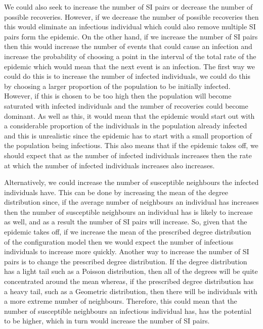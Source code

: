 \documentclass{uonmathsreport}
\begin{document}
We could also seek to increase the number of SI pairs or decrease the number of possible recoveries. However, if we decrease the number of possible recoveries then this would eliminate an infectious individual which could also remove multiple SI pairs form the epidemic. On the other hand, if we increase the number of SI pairs then this would increase the number of events that could cause an infection and increase the probability of choosing a point in the interval of the total rate of the epidemic which would mean that the next event is an infection. The first way we could do this is to increase the number of infected individuals, we could do this by choosing a larger proportion of the population to be initially infected. However, if this is chosen to be too high then the population will become saturated with infected individuals and the number of recoveries could become dominant. As well as this, it would mean that the epidemic would start out with a considerable proportion of the individuals in the population already infected and this is unrealistic since the epidemic has to start with a small proportion of the population being infectious. This also means that if the epidemic takes off, we should expect that as the number of infected individuals increases then the rate at which the number of infected individuals increases also increases. 

Alternatively, we could increase the number of susceptible neighbours the infected individuals have. This can be done by increasing the mean of the degree distribution since, if the average number of neighbours an individual has increases then the number of susceptible neighbours an individual has is likely to increase as well, and as a result the number of SI pairs will increase. So, given that the epidemic takes off, if we increase the mean of the prescribed degree distribution of the configuration model then we would expect the number of infectious individuals to increase more quickly. Another way to increase the number of SI pairs is to change the prescribed degree distribution. If the degree distribution has a light tail such as a Poisson distribution, then all of the degrees will be quite concentrated around the mean whereas, if the prescribed degree distribution has a heavy tail, such as a Geometric distribution, then there will be individuals with a more extreme number of neighbours. Therefore, this could mean that the number of susceptible neighbours an infectious individual has, has the potential to be higher, which in turn would increase the number of SI pairs.
\end{document}
